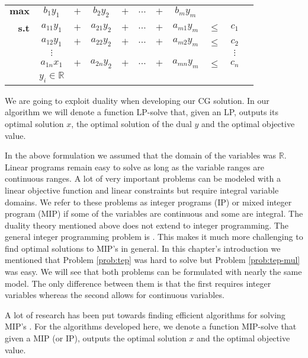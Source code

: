 \begin{center}
\begin{tabular}{rcccccccccc}
$\displaystyle \mathbf{max}$ & $b_1 y_1$ & $+$ & $b_2 y_2$ & $+$ & $\ldots$ & $+$ & $b_m y_m$ & & \\
\textbf{s.t} & $a_{11} y_1$ & $+$ & $a_{21} y_2$ & $+$ & $\ldots$ & $+$ & $a_{m1} y_m$ & $\leq$ & $c_1$ \\
             & $a_{12} y_1$ & $+$ & $a_{22} y_2$ & $+$ & $\ldots$ & $+$ & $a_{m2} y_m$ & $\leq$ & $c_2$ \\
             & $\vdots$ & & & & & & & & $\vdots$ \\
             & $a_{1n} x_1$ & $+$ & $a_{2n} y_2$ & $+$ & $\ldots$ & $+$ & $a_{mn} y_m$ & $\leq$ & $c_n$ \\[0.2cm]
& $y_i \in \mathbb{R}$ & & & & & & & &
\end{tabular}
\end{center}

We are going to exploit duality when developing our CG solution. In our algorithm we will denote a function \textsf{LP-solve} that,
given an LP, outputs its optimal solution $x$, the optimal solution of the dual $y$ and the optimal objective value.

In the above formulation we assumed that the domain of the variables was $\mathbb{R}$. Linear programs remain easy to solve as long as the
variable ranges are continuous ranges. A lot of very important problems can be modeled with a linear objective function and
linear constraints but require integral variable domains. We refer to these problems as integer programs (IP) or mixed integer program (MIP)
if some of the variables are continuous and some are integral. The duality theory mentioned above does not extend to integer programming.
The general integer programming problem is \NPhard. 
This makes it much more challenging to find optimal solutions to MIP's in general. In this chapter's introduction we mentioned that
Problem \ref{prob:tep} was hard to solve but Problem \ref{prob:tep-mul} was easy. We will see that both problems can be formulated with nearly the same
model. The only difference between them is that the first requires integer variables whereas the second allows for continuous variables.

A lot of research has been put towards finding efficient algorithms for solving MIP's \cite{wolsey}. For the algorithms developed here,
we denote a function  \textsf{MIP-solve} that given a MIP (or IP), outputs the optimal solution $x$ and the optimal objective value.

